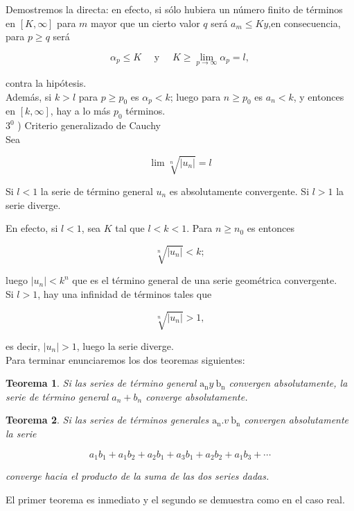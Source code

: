 \documentclass[10pt]{article}
\theoremstyle{plain}
\newtheorem{theorem}{Teorema}[section]
\theoremstyle{definition}
\theoremstyle{remark}
\begin{document}
Demostremos la directa: en efecto, si sólo hubiera un número finito de términos en $[K, \infty]$ para $m$ mayor que un cierto valor $q$ será $a_{m} \leqslant K y$,en consecuencia, para $p \geqslant q$ será

$$
\alpha_{p} \leqslant K \quad \text { y } \quad K \geqslant \lim _{p \rightarrow \infty} \alpha_{p}=l,
$$

contra la hipótesis.\\
Además, si $k>l$ para $p \geqslant p_{0}$ es $\alpha_{p}<k$; luego para $n \geqslant p_{0}$ es $a_{n}<k$, y entonces en $[k, \infty]$, hay a lo más $p_{0}$ términos.\\
$3^{0}$ ) Criterio generalizado de Cauchy\\
Sea

$$
\lim \sqrt[n]{\left|u_{n}\right|}=l
$$

Si $l<1$ la serie de término general $u_{n}$ es absolutamente convergente. Si $l>1$ la serie diverge.

En efecto, si $l<1$, sea $K$ tal que $l<k<1$. Para $n \geqslant n_{0}$ es entonces

$$
\sqrt[n]{\left|u_{n}\right|}<k ;
$$

luego $\left|u_{n}\right|<k^{n}$ que es el término general de una serie geométrica convergente.\\
Si $l>1$, hay una infinidad de términos tales que

$$
\sqrt[n]{\left|u_{n}\right|}>1,
$$

es decir, $\left|u_{n}\right|>1$, luego la serie diverge.\\
Para terminar enunciaremos los dos teoremas siguientes:

\begin{theorem}
Si las series de término general $\mathrm{a}_{\mathrm{n}} y \mathrm{~b}_{\mathrm{n}}$ convergen absolutamente, la serie de término general $a_{n}+b_{n}$ converge absolutamente.
\end{theorem}

\begin{theorem}
Si las series de términos generales $\mathrm{a}_{\mathrm{n}} . v \mathrm{~b}_{\mathrm{n}}$ convergen absolutamente la serie

$$
a_{1} b_{1}+a_{1} b_{2}+a_{2} b_{1}+a_{3} b_{1}+a_{2} b_{2}+a_{1} b_{3}+\cdots
$$

converge hacia el producto de la suma de las dos series dadas.
\end{theorem}

El primer teorema es inmediato y el segundo se demuestra como en el caso real.
\end{document}
